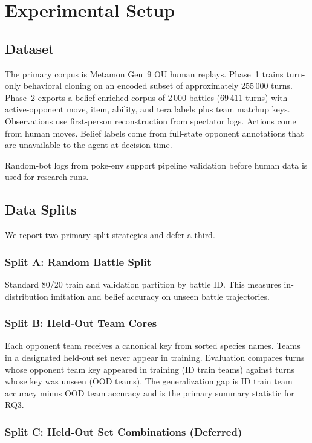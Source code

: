 \chapter{Experimental Setup}
\label{ch:experiments}

\section{Dataset}

The primary corpus is Metamon Gen~9 OU human replays. Phase~1 trains turn-only
behavioral cloning on an encoded subset of approximately 255\,000 turns.
Phase~2 exports a belief-enriched corpus of 2\,000 battles (69\,411 turns) with
active-opponent move, item, ability, and tera labels plus team matchup keys.
Observations use first-person reconstruction from spectator logs. Actions come
from human moves. Belief labels come from full-state opponent annotations that
are unavailable to the agent at decision time.

Random-bot logs from poke-env support pipeline validation before human data is
used for research runs.

\section{Data Splits}

We report two primary split strategies and defer a third.

\subsection{Split A: Random Battle Split}

Standard 80/20 train and validation partition by battle ID. This measures
in-distribution imitation and belief accuracy on unseen battle trajectories.

\subsection{Split B: Held-Out Team Cores}

Each opponent team receives a canonical key from sorted species names. Teams in
a designated held-out set never appear in training. Evaluation compares turns
whose opponent team key appeared in training (ID train teams) against turns
whose key was unseen (OOD teams). The generalization gap is ID train team
accuracy minus OOD team accuracy and is the primary summary statistic for RQ3.

\subsection{Split C: Held-Out Set Combinations (Deferred)}


